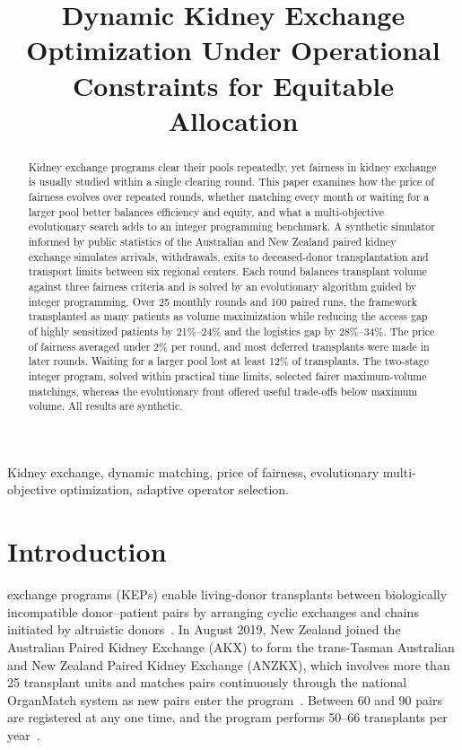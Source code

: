 \documentclass[journal]{IEEEtran}
\begin{document}
\title{Dynamic Kidney Exchange Optimization Under Operational Constraints for Equitable Allocation}

\maketitle
\begin{abstract}
Kidney exchange programs clear their pools repeatedly, yet fairness in
kidney exchange is usually studied within a single clearing round. This
paper examines how the price of fairness evolves over repeated rounds,
whether matching every month or waiting for a larger pool better balances
efficiency and equity, and what a multi-objective evolutionary search adds
to an integer programming benchmark. A synthetic simulator informed by
public statistics of the Australian and New Zealand paired kidney exchange simulates arrivals, withdrawals, exits to deceased-donor transplantation and
transport limits between six regional centers. Each round balances
transplant volume against three fairness criteria and is solved by an
evolutionary algorithm guided by integer programming. Over 25 monthly
rounds and 100 paired runs, the framework transplanted as many patients as
volume maximization while reducing the access gap of highly sensitized
patients by 21\%--24\% and the logistics gap by 28\%--34\%. The price of
fairness averaged under 2\% per round, and most deferred transplants were
made in later rounds. Waiting for a larger pool lost at least 12\% of transplants. The two-stage integer program, solved within practical time
limits, selected fairer maximum-volume matchings, whereas the evolutionary
front offered useful trade-offs below maximum volume. All results are
synthetic.
\end{abstract}

\begin{IEEEkeywords}
Kidney exchange, dynamic matching, price of fairness, evolutionary
multi-objective optimization, adaptive operator selection.
\end{IEEEkeywords}

\section{Introduction}
\label{sec:intro}

 exchange programs (KEPs) enable living-donor
transplants between biologically incompatible donor--patient pairs by
arranging cyclic exchanges and chains initiated by altruistic
donors~\cite{roth2004kidney}.
In August 2019, New Zealand joined the Australian Paired Kidney Exchange
(AKX) to form the trans-Tasman Australian and New Zealand Paired Kidney
Exchange (ANZKX), which involves more than 25 transplant units and
matches pairs continuously through the national OrganMatch system as
new pairs enter the program~\cite{anzkxprotocol2021}.
Between 60 and 90 pairs are registered at any one time, and the
program performs 50--66 transplants per year~\cite{ANZKX2021,DonateLife2024}.
\end{document}
